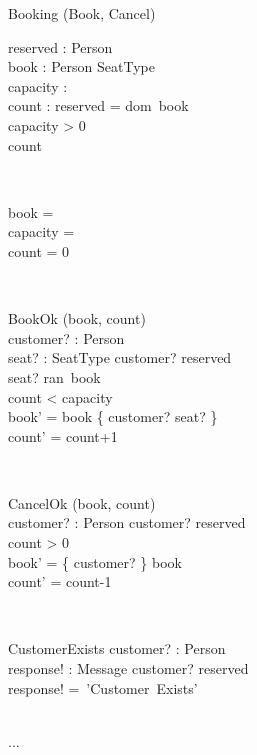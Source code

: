 \documentclass[12pt]{article}
\begin{document}
\begin{class}{Booking}
\also
\upharpoonright (Book, Cancel) \\
\begin{state}
reserved :  Person\\
book : Person \pfun SeatType\\ %
capacity : \\
count :  
\where
reserved = dom~book\\ 
capacity > 0\\
count 
\end{state} \\
\begin{init}
book = \emptyset\\
capacity = \\
count = 0
\end{init} \\
\begin{op}{BookOk}
\Delta (book, count) \\
customer? : Person\\
seat? : SeatType
\ST
customer? \notin reserved\\
seat? \notin ran~book\\
count < capacity\\
book' = book \cup \{ customer? \mapsto seat? \}\\
count' = count+1
\end{op}\\
\begin{op}{CancelOk}
\Delta (book, count) \\
customer? : Person
\ST
customer? \in reserved\\
count > 0\\
book' = \{ customer? \} \ndres book\\
count' = count-1
\end{op}\\
\begin{op}{CustomerExists}
customer? : Person\\
response! : Message
\ST
customer? \in reserved\\
response! =~'Customer~Exists'
\end{op}\\
...\\
\end{class}
\end{document}

